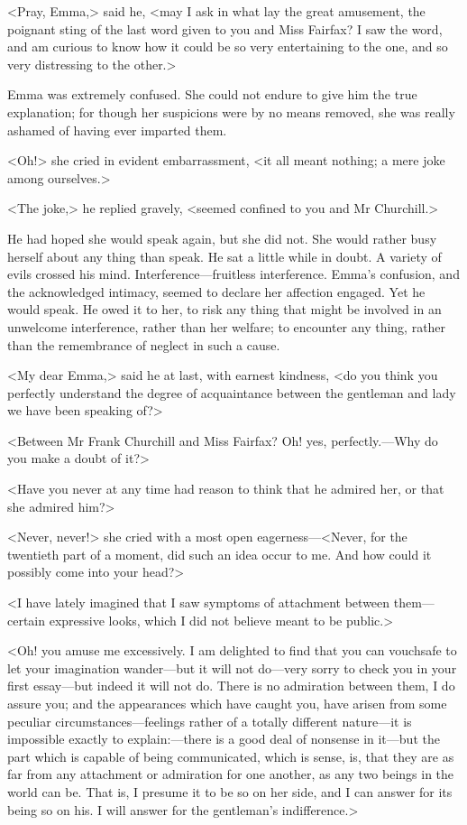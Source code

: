 <Pray, Emma,> said he, <may I ask in what lay the great amusement, the poignant sting of the last word given to you and Miss Fairfax? I saw the word, and am curious to know how it could be so very entertaining to the one, and so very distressing to the other.>

Emma was extremely confused. She could not endure to give him the true explanation; for though her suspicions were by no means removed, she was really ashamed of having ever imparted them.

<Oh!> she cried in evident embarrassment, <it all meant nothing; a mere joke among ourselves.>

<The joke,> he replied gravely, <seemed confined to you and Mr Churchill.>

He had hoped she would speak again, but she did not. She would rather busy herself about any thing than speak. He sat a little while in doubt. A variety of evils crossed his mind. Interference—fruitless interference. Emma's confusion, and the acknowledged intimacy, seemed to declare her affection engaged. Yet he would speak. He owed it to her, to risk any thing that might be involved in an unwelcome interference, rather than her welfare; to encounter any thing, rather than the remembrance of neglect in such a cause.

<My dear Emma,> said he at last, with earnest kindness, <do you think you perfectly understand the degree of acquaintance between the gentleman and lady we have been speaking of?>

<Between Mr Frank Churchill and Miss Fairfax? Oh! yes, perfectly.—Why do you make a doubt of it?>

<Have you never at any time had reason to think that he admired her, or that she admired him?>

<Never, never!> she cried with a most open eagerness—<Never, for the twentieth part of a moment, did such an idea occur to me. And how could it possibly come into your head?>

<I have lately imagined that I saw symptoms of attachment between them—certain expressive looks, which I did not believe meant to be public.>

<Oh! you amuse me excessively. I am delighted to find that you can vouchsafe to let your imagination wander—but it will not do—very sorry to check you in your first essay—but indeed it will not do. There is no admiration between them, I do assure you; and the appearances which have caught you, have arisen from some peculiar circumstances—feelings rather of a totally different nature—it is impossible exactly to explain:—there is a good deal of nonsense in it—but the part which is capable of being communicated, which is sense, is, that they are as far from any attachment or admiration for one another, as any two beings in the world can be. That is, I presume it to be so on her side, and I can answer for its being so on his. I will answer for the gentleman's indifference.>

